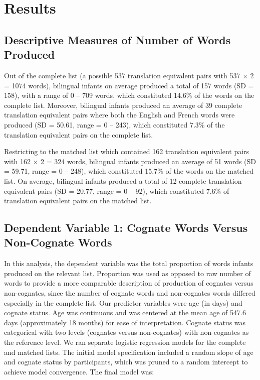 \documentclass[
  ,man,floatsintext]{apa6}
\begin{document}
\hypertarget{results}{%
\section{Results}\label{results}}

\hypertarget{descriptive-measures-of-number-of-words-produced}{%
\subsection{Descriptive Measures of Number of Words Produced}\label{descriptive-measures-of-number-of-words-produced}}

Out of the complete list (a possible 537 translation equivalent pairs with 537 × 2 = 1074 words), bilingual infants on average produced a total of 157 words (SD = 158), with a range of 0 -- 709 words, which constituted 14.6\% of the words on the complete list. Moreover, bilingual infants produced an average of 39 complete translation equivalent pairs where both the English and French words were produced (SD = 50.61, range = 0 -- 243), which constituted 7.3\% of the translation equivalent pairs on the complete list.

Restricting to the matched list which contained 162 translation equivalent pairs with 162 × 2 = 324 words, bilingual infants produced an average of 51 words (SD = 59.71, range = 0 -- 248), which constituted 15.7\% of the words on the matched list. On average, bilingual infants produced a total of 12 complete translation equivalent pairs (SD = 20.77, range = 0 -- 92), which constituted 7.6\% of translation equivalent pairs on the matched list.

\hypertarget{dependent-variable-1-cognate-words-versus-non-cognate-words}{%
\subsection{Dependent Variable 1: Cognate Words Versus Non-Cognate Words}\label{dependent-variable-1-cognate-words-versus-non-cognate-words}}

In this analysis, the dependent variable was the total proportion of words infants produced on the relevant list. Proportion was used as opposed to raw number of words to provide a more comparable description of production of cognates versus non-cognates, since the number of cognate words and non-cognates words differed especially in the complete list. Our predictor variables were age (in days) and cognate status. Age was continuous and was centered at the mean age of 547.6 days (approximately 18 months) for ease of interpretation. Cognate status was categorical with two levels (cognates versus non-cognates) with non-cognates as the reference level. We ran separate logistic regression models for the complete and matched lists. The initial model specification included a random slope of age and cognate status by participants, which was pruned to a random intercept to achieve model convergence. The final model was:
\end{document}
